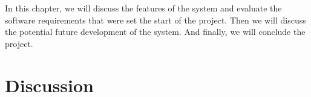 In this chapter, we will discuss the features of the system and evaluate the software requirements that were set the
start of the project.
Then we will discuss the potential future development of the system.
And finally, we will conclude the project.

\section{Discussion}\label{sec:discussion-conclusion}




